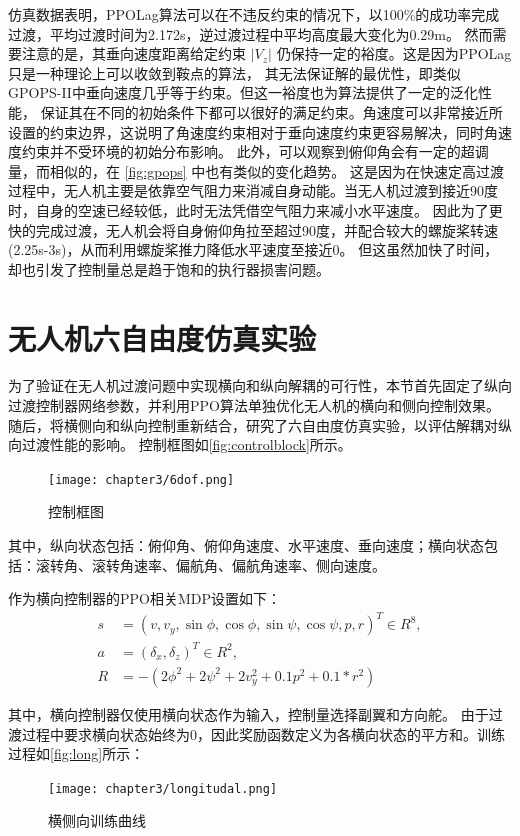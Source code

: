仿真数据表明，PPOLag算法可以在不违反约束的情况下，以100\%的成功率完成过渡，平均过渡时间为2.172s，逆过渡过程中平均高度最大变化为0.29m。
然而需要注意的是，其垂向速度距离给定约束 $\left | V_{z} \right |$ 仍保持一定的裕度。这是因为PPOLag只是一种理论上可以收敛到鞍点的算法，
其无法保证解的最优性，即类似GPOPS-II中垂向速度几乎等于约束。但这一裕度也为算法提供了一定的泛化性能，
保证其在不同的初始条件下都可以很好的满足约束。角速度可以非常接近所设置的约束边界，这说明了角速度约束相对于垂向速度约束更容易解决，同时角速度约束并不受环境的初始分布影响。
此外，可以观察到俯仰角会有一定的超调量，而相似的，在 \autoref{fig:gpops} 中也有类似的变化趋势。
这是因为在快速定高过渡过程中，无人机主要是依靠空气阻力来消减自身动能。当无人机过渡到接近90度时，自身的空速已经较低，此时无法凭借空气阻力来减小水平速度。
因此为了更快的完成过渡，无人机会将自身俯仰角拉至超过90度，并配合较大的螺旋桨转速(2.25s-3s)，从而利用螺旋桨推力降低水平速度至接近0。
但这虽然加快了时间，却也引发了控制量总是趋于饱和的执行器损害问题。

\section{无人机六自由度仿真实验}
为了验证在无人机过渡问题中实现横向和纵向解耦的可行性，本节首先固定了纵向过渡控制器网络参数，并利用PPO算法单独优化无人机的横向和侧向控制效果。
随后，将横侧向和纵向控制重新结合，研究了六自由度仿真实验，以评估解耦对纵向过渡性能的影响。
控制框图如\autoref{fig:controlblock}所示。
\begin{figure}[H]
\centering
\texttt{[image: chapter3/6dof.png]}
\caption{\label{fig:tecs}控制框图}
\label{fig:controlblock}
\end{figure}
其中，纵向状态包括：俯仰角、俯仰角速度、水平速度、垂向速度；横向状态包括：滚转角、滚转角速率、偏航角、偏航角速率、侧向速度。

作为横向控制器的PPO相关MDP设置如下：
\begin{equation}
\begin{aligned}
s &= \left(v,v_{y},\sin \phi , \cos \phi , \sin \psi , \cos \psi ,p, r\right)^{T} \in R^{8}, \\
a &= \left(\delta_{x},\delta_{z}\right)^{T} \in R^{2},\\
R &= -(2 \phi^{2}+2\psi^{2}+2v_{y}^{2}+0.1p^{2}+0.1*r^{2})
\end{aligned}
\end{equation}

其中，横向控制器仅使用横向状态作为输入，控制量选择副翼和方向舵。
由于过渡过程中要求横向状态始终为0，因此奖励函数定义为各横向状态的平方和。训练过程如\autoref{fig:long}所示：
\begin{figure}[htb]
    \centering
    \texttt{[image: chapter3/longitudal.png]}
    \caption{\label{fig:tecs}横侧向训练曲线}
    \label{fig:long}
\end{figure}

